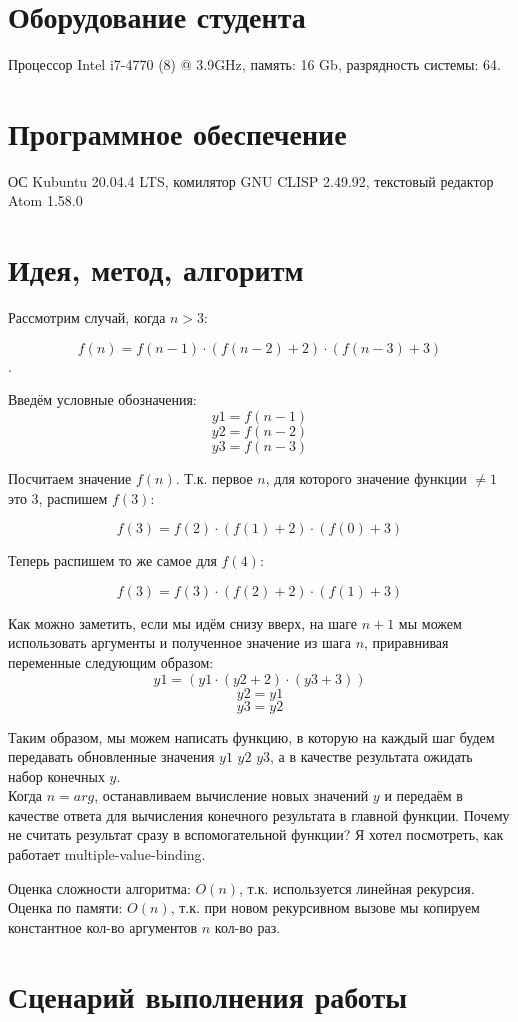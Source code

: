 \documentclass[12pt]{article}
\begin{document}
\section{Оборудование студента}
Процессор Intel i7-4770 (8) @ 3.9GHz, память: 16 Gb, разрядность системы: 64.

\section{Программное обеспечение}
ОС Kubuntu 20.04.4 LTS, комилятор GNU CLISP 2.49.92, текстовый редактор Atom 1.58.0

\pagebreak
\section{Идея, метод, алгоритм}
Рассмотрим случай, когда $n > 3$:

$$f(n) = f(n-1) \cdot (f(n-2)+2) \cdot (f(n-3)+3)$$.

Введём условные обозначения:
$$y1 = f(n-1)$$
$$y2 = f(n-2)$$
$$y3 = f(n-3)$$

Посчитаем значение $f(n)$. Т.к. первое $n$, для которого значение функции $\neq 1$ это $3$, распишем $f(3)$:

$$f(3) = f(2) \cdot (f(1)+2) \cdot (f(0)+3)$$

Теперь распишем то же самое для $f(4)$:

$$f(3) = f(3) \cdot (f(2)+2) \cdot (f(1)+3)$$

Как можно заметить, если мы идём снизу вверх, на шаге $n+1$ мы можем использовать аргументы и полученное значение из шага $n$, 
приравнивая переменные следующим образом:
$$y1 = (y1 \cdot (y2 + 2) \cdot (y3 + 3))$$
$$y2 = y1$$
$$y3 = y2$$

Таким образом, мы можем написать функцию, в которую на каждый шаг будем передавать обновленные значения $y1$ $y2$ $y3$, а в качестве результата ожидать
набор конечных $y$.
\\
Когда $n = arg$, останавливаем вычисление новых значений $y$ и передаём в качестве ответа для вычисления конечного результата в главной функции.
Почему не считать результат сразу в вспомогательной функции? Я хотел посмотреть, как работает multiple-value-binding.


Оценка сложности алгоритма: $O(n)$, т.к. используется линейная рекурсия.
\\
Оценка по памяти: $O(n)$, т.к. при новом рекурсивном вызове мы копируем константное кол-во аргументов $n$ кол-во раз.

\section{Сценарий выполнения работы}
\end{document}
